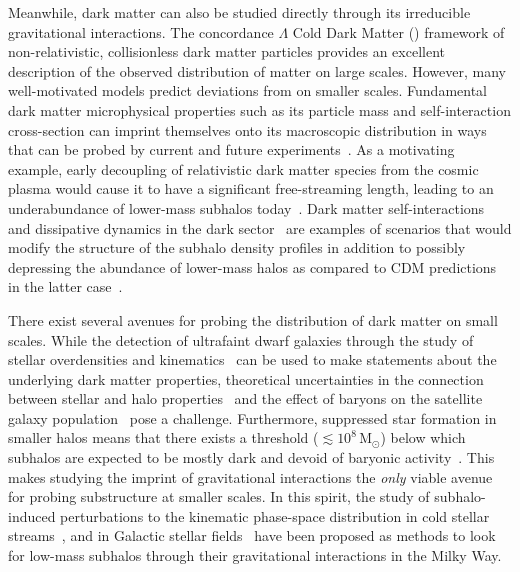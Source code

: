 \documentclass[twocolumn]{aastex63}
\begin{document}
Meanwhile, dark matter can also be studied directly through its irreducible gravitational interactions. The concordance $\Lambda$ Cold Dark Matter (\lcdm) framework of non-relativistic, collisionless dark matter particles provides an excellent description of the observed distribution of matter on large scales. However, many well-motivated models predict deviations from \lcdm on smaller scales. Fundamental dark matter microphysical properties such as its particle mass and self-interaction cross-section can imprint themselves onto its macroscopic distribution in ways that can be probed by current and future experiments~\citep{1712.06615,2019arXiv190201055D,1903.04742}. As a motivating example, early decoupling of relativistic dark matter species from the cosmic plasma would cause it to have a significant free-streaming length, leading to an underabundance of lower-mass subhalos today~\citep{1983ApJ...274..443B,2001ApJ...556...93B,astro-ph/0004381,0807.0622,1008.0992}. Dark matter self-interactions~\citep{astro-ph/9909386,astro-ph/0006134,astro-ph/0006218,astro-ph/0205322,1201.5892,1208.3026,1211.6426,1311.6524,1508.03339,1611.02716,1609.08626,1805.03203,1904.10539,1901.00499,1903.01469} and dissipative dynamics in the dark sector~\citep{1303.1521,1702.05482,1706.04195,1707.03829} are examples of scenarios that would modify the structure of the subhalo density profiles in addition to possibly depressing the abundance of lower-mass halos as compared to CDM predictions in the latter case~\citep{1405.2075,1412.4905,1512.05349}.

There exist several avenues for probing the distribution of dark matter on small scales. While the detection of ultrafaint dwarf galaxies through the study of stellar overdensities and kinematics~\citep{0706.2687,1503.02079,1503.02584,1508.03622} can be used to make statements about the underlying dark matter properties, theoretical uncertainties in the connection between stellar and halo properties~\citep{1809.05542,1804.03097} and the effect of baryons on the satellite galaxy population~\citep{1608.01849,1701.03792,1812.00044,1811.11791} pose a challenge. Furthermore, suppressed star formation in smaller halos means that there exists a threshold ($\lesssim 10^8\,\mathrm{M}_\odot$) below which subhalos are expected to be mostly dark and devoid of baryonic activity~\citep{1992MNRAS.256P..43E,1611.02281,1607.03127}. This makes studying the imprint of gravitational interactions the \emph{only} viable avenue for probing substructure at smaller scales. In this spirit, the study of subhalo-induced perturbations to the kinematic phase-space distribution in cold stellar streams~\citep{astro-ph/9807243,1109.6022,1303.4342,1804.06854,1811.03631}, and in Galactic stellar fields~\citep{1711.03554} have been proposed as methods to look for low-mass subhalos through their gravitational interactions in the Milky Way.
\end{document}
